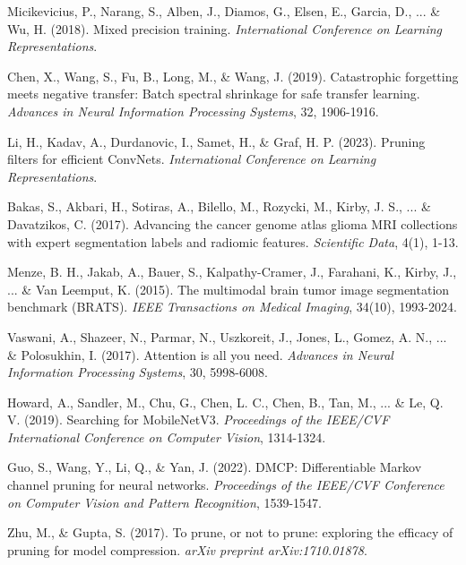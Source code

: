 \documentclass[12pt,a4paper]{article}
\begin{document}
\begin{enumerate}
\begin{thebibliography}{99}
Micikevicius, P., Narang, S., Alben, J., Diamos, G., Elsen, E., Garcia, D., ... \& Wu, H. (2018). Mixed precision training. \textit{International Conference on Learning Representations}.

Chen, X., Wang, S., Fu, B., Long, M., \& Wang, J. (2019). Catastrophic forgetting meets negative transfer: Batch spectral shrinkage for safe transfer learning. \textit{Advances in Neural Information Processing Systems}, 32, 1906-1916.

Li, H., Kadav, A., Durdanovic, I., Samet, H., \& Graf, H. P. (2023). Pruning filters for efficient ConvNets. \textit{International Conference on Learning Representations}.

Bakas, S., Akbari, H., Sotiras, A., Bilello, M., Rozycki, M., Kirby, J. S., ... \& Davatzikos, C. (2017). Advancing the cancer genome atlas glioma MRI collections with expert segmentation labels and radiomic features. \textit{Scientific Data}, 4(1), 1-13.

Menze, B. H., Jakab, A., Bauer, S., Kalpathy-Cramer, J., Farahani, K., Kirby, J., ... \& Van Leemput, K. (2015). The multimodal brain tumor image segmentation benchmark (BRATS). \textit{IEEE Transactions on Medical Imaging}, 34(10), 1993-2024.

Vaswani, A., Shazeer, N., Parmar, N., Uszkoreit, J., Jones, L., Gomez, A. N., ... \& Polosukhin, I. (2017). Attention is all you need. \textit{Advances in Neural Information Processing Systems}, 30, 5998-6008.

Howard, A., Sandler, M., Chu, G., Chen, L. C., Chen, B., Tan, M., ... \& Le, Q. V. (2019). Searching for MobileNetV3. \textit{Proceedings of the IEEE/CVF International Conference on Computer Vision}, 1314-1324.

Guo, S., Wang, Y., Li, Q., \& Yan, J. (2022). DMCP: Differentiable Markov channel pruning for neural networks. \textit{Proceedings of the IEEE/CVF Conference on Computer Vision and Pattern Recognition}, 1539-1547.

Zhu, M., \& Gupta, S. (2017). To prune, or not to prune: exploring the efficacy of pruning for model compression. \textit{arXiv preprint arXiv:1710.01878}.

\end{thebibliography}

\newpage
\appendix


\end{enumerate}
\end{document}
